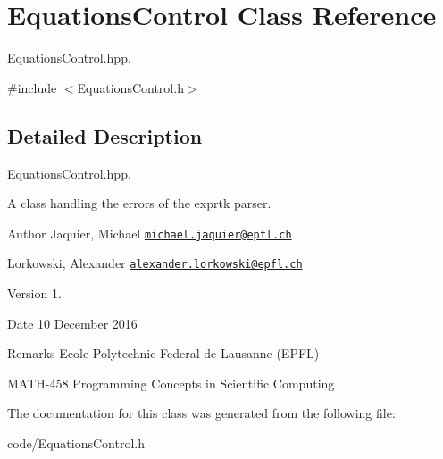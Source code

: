 \hypertarget{class_equations_control}{}\section{Equations\+Control Class Reference}
\label{class_equations_control}


Equations\+Control.\+hpp.  




{\ttfamily \#include $<$Equations\+Control.\+h$>$}



\subsection{Detailed Description}
Equations\+Control.\+hpp. 

A class handling the errors of the exprtk parser. \begin{DoxyAuthor}{Author}
Jaquier, Michael \href{mailto:michael.jaquier@epfl.ch}{\tt michael.\+jaquier@epfl.\+ch} 

Lorkowski, Alexander \href{mailto:alexander.lorkowski@epfl.ch}{\tt alexander.\+lorkowski@epfl.\+ch} 
\end{DoxyAuthor}
\begin{DoxyVersion}{Version}
1. 
\end{DoxyVersion}
\begin{DoxyDate}{Date}
10 December 2016 
\end{DoxyDate}
\begin{DoxyRemark}{Remarks}
Ecole Polytechnic Federal de Lausanne (E\+P\+FL) 

M\+A\+T\+H-\/458 Programming Concepts in Scientific Computing 
\end{DoxyRemark}


The documentation for this class was generated from the following file\+:\begin{DoxyCompactItemize}
\item 
code/Equations\+Control.\+h\end{DoxyCompactItemize}
